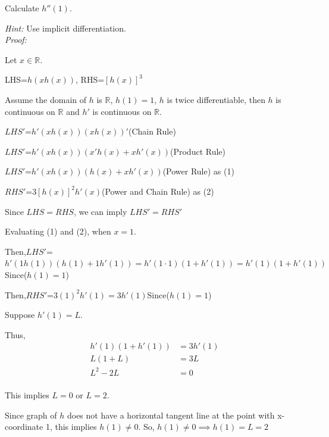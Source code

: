 \documentclass[12pt]{exam}
\newcommand {\DS} [1] {${\displaystyle #1}$}
\newcommand{\vv}{\vspace{.4cm}}
\newcommand{\R}{\mathbb{R}}
\begin{document}
\begin{enumerate}[resume]
	Calculate \DS{h''(1)}.
	
	\emph{Hint:} Use implicit differentiation.
	\vv
	\\
	
	\emph{Proof:}

	Let $x\in\R$.

	LHS=$h(xh(x))$, RHS=$[h(x)]^3$

	Assume the domain of $h$ is $\R$, $h(1)=1$, $h$ is twice differentiable, then $h$ is continuous on $\R$ and $h'$ is continuous on $\R$.

	\DS{LHS'}=$h'(xh(x))(xh(x))'$\qquad(Chain Rule)

	\DS{LHS'}=$h'(xh(x))(x'h(x)+xh'(x))$\qquad(Product Rule)

	\DS{LHS'}=$h'(xh(x))(h(x)+xh'(x))$\qquad(Power Rule) as (1)

	\DS{RHS'}=$3[h(x)]^2h'(x)$\qquad(Power and Chain Rule) as (2)

	Since $LHS=RHS$, we can imply $LHS'=RHS'$

	Evaluating (1) and (2), when $x=1$. 

	Then,\DS{LHS'}=$h'(1h(1))(h(1)+1h'(1))=h'(1\cdot1)(1+h'(1))=h'(1)(1+h'(1))$\qquad Since($h(1)=1$)

	Then,\DS{RHS'}=$3(1)^2h'(1)=3h'(1)$\qquad Since($h(1)=1$)

	Suppose $h'(1)=L.$

	Thus,
	\begin{align*}
	    h'(1)(1+h'(1))&=3h'(1) \\
	    L(1+L)&=3L \\
	    L^2-2L&=0 \\
	\end{align*}


	This implies $L=0$ or $L=2.$

	Since graph of $h$ does not have a horizontal tangent line at the point with x-coordinate 1, this implies $h(1)\neq0$.
	So, $h(1)\neq 0 \implies h(1)=L=2$\\


\end{enumerate}
\end{document}
